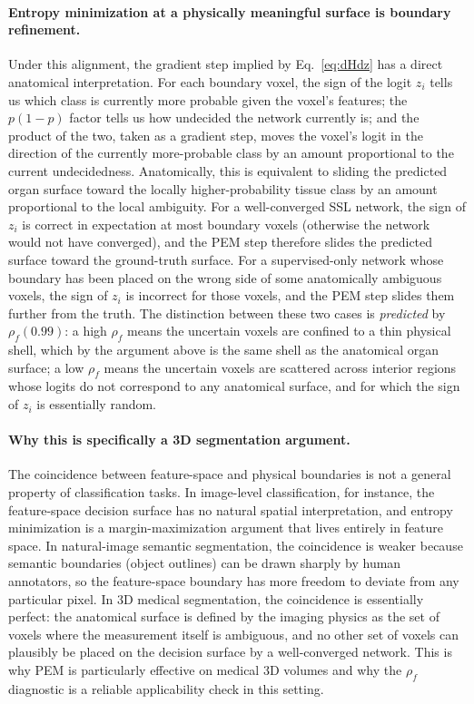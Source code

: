 \paragraph{Entropy minimization at a physically meaningful surface is boundary refinement.}
Under this alignment, the gradient step implied by Eq.~\ref{eq:dHdz} has a direct anatomical interpretation. For each boundary voxel, the sign of the logit $z_i$ tells us which class is currently more probable given the voxel's features; the $p(1{-}p)$ factor tells us how undecided the network currently is; and the product of the two, taken as a gradient step, moves the voxel's logit in the direction of the currently more-probable class by an amount proportional to the current undecidedness. Anatomically, this is equivalent to sliding the predicted organ surface toward the locally higher-probability tissue class by an amount proportional to the local ambiguity. For a well-converged SSL network, the sign of $z_i$ is correct in expectation at most boundary voxels (otherwise the network would not have converged), and the PEM step therefore slides the predicted surface toward the ground-truth surface. For a supervised-only network whose boundary has been placed on the wrong side of some anatomically ambiguous voxels, the sign of $z_i$ is incorrect for those voxels, and the PEM step slides them further from the truth. The distinction between these two cases is \emph{predicted} by $\rho_f(0.99)$: a high $\rho_f$ means the uncertain voxels are confined to a thin physical shell, which by the argument above is the same shell as the anatomical organ surface; a low $\rho_f$ means the uncertain voxels are scattered across interior regions whose logits do not correspond to any anatomical surface, and for which the sign of $z_i$ is essentially random.

\paragraph{Why this is specifically a 3D segmentation argument.}
The coincidence between feature-space and physical boundaries is not a general property of classification tasks. In image-level classification, for instance, the feature-space decision surface has no natural spatial interpretation, and entropy minimization is a margin-maximization argument that lives entirely in feature space. In natural-image semantic segmentation, the coincidence is weaker because semantic boundaries (object outlines) can be drawn sharply by human annotators, so the feature-space boundary has more freedom to deviate from any particular pixel. In 3D medical segmentation, the coincidence is essentially perfect: the anatomical surface is defined by the imaging physics as the set of voxels where the measurement itself is ambiguous, and no other set of voxels can plausibly be placed on the decision surface by a well-converged network. This is why PEM is particularly effective on medical 3D volumes and why the $\rho_f$ diagnostic is a reliable applicability check in this setting.

